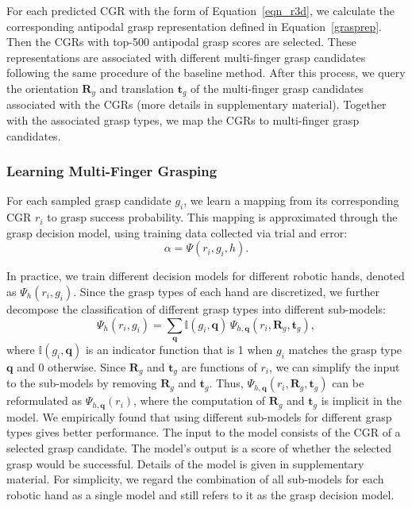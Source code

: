 For each predicted CGR with the form of Equation~\eqref{eqn_r3d}, we calculate the corresponding antipodal grasp representation defined in Equation~\eqref{grasprep}. Then the CGRs with top-500 antipodal grasp scores are selected. These representations are associated with different multi-finger grasp candidates following the same procedure of the baseline method. After this process, we query the orientation $\mathbf{R}_g$ and translation $\mathbf{t}_g$ of the multi-finger grasp candidates associated with the CGRs (more details in supplementary material). Together with the associated grasp types, we map the CGRs to multi-finger grasp candidates.





\subsubsection*{Learning Multi-Finger Grasping} \label{model_architecture}
For each sampled grasp candidate $g_i$, we learn a mapping from its corresponding CGR $r_i$ to grasp success probability. This mapping is approximated through the grasp decision model, using training data collected via trial and error: 
\begin{equation}
\nonumber\alpha = \Psi(r_i, g_i, h).
\end{equation}

In practice, we  train different decision models for different robotic hands, denoted as  $\Psi_h(r_i, g_i)$. Since the grasp types of each hand are discretized, we further decompose the classification of different grasp types into different sub-models:
\[
\nonumber\Psi_h(r_i, g_i) = \sum_{\mathbf{q}} \mathbb{I}(g_i, \mathbf{q}) \, \Psi_{h,\mathbf{q}}(r_i, \mathbf{R}_g, \mathbf{t}_g),
\]
where $\mathbb{I}(g_i, \mathbf{q})$ is an indicator function that is 1 when $g_i$ matches the grasp type $\mathbf{q}$ and 0 otherwise. Since $\mathbf{R}_g$ and \(\mathbf{t}_g\) are functions of \(r_i\), we can simplify the input to the sub-models by removing \(\mathbf{R}_g\) and \(\mathbf{t}_g\). Thus, \(\Psi_{h,\mathbf{q}}(r_i, \mathbf{R}_g, \mathbf{t}_g)\) can be reformulated as \(\Psi_{h,\mathbf{q}}(r_i)\), where the computation of \(\mathbf{R}_g\) and \(\mathbf{t}_g\) is implicit in the model. We empirically found that using different sub-models for different grasp types gives better performance. The input to the model consists of the CGR of a selected grasp candidate. The model's output is a score of whether the selected grasp would be successful. Details of the model is given in supplementary material. For simplicity, we regard the combination of all sub-models for each robotic hand as a single model and still refers to it as the grasp decision model.


